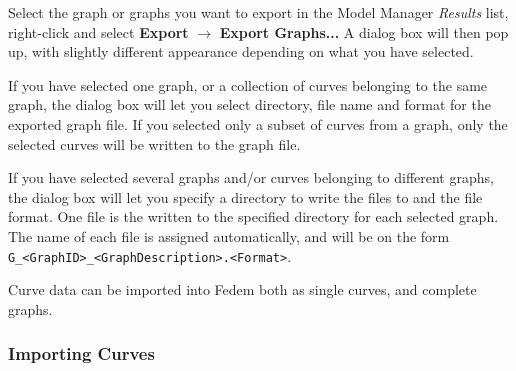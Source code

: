 Select the graph or graphs you want to export in the Model Manager
{\sl Results} list, right-click and select \textbf{Export} $\rightarrow$
\textbf{Export Graphs...} A dialog box will then pop up, with slightly
different appearance depending on what you have selected.

If you have selected one graph, or a collection of curves belonging to the same
graph, the dialog box will let you select directory, file name and format for
the exported graph file. If you selected only a subset of curves from a graph,
only the selected curves will be written to the graph file.

If you have selected several graphs and/or curves belonging to different
graphs, the dialog box will let you specify a directory to write the
files to and the file format. One file is the written to the specified
directory for each selected graph. The name of each file is assigned
automatically, and will be on the form
{\tt G\_\textless GraphID\textgreater\_\textless GraphDescription\textgreater.\textless Format\textgreater}.





Curve data can be imported into Fedem both as single curves,
and complete graphs.

\subsubsection{Importing Curves}

